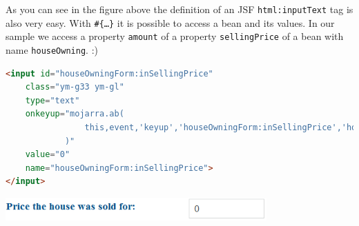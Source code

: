 As you can see in the figure above the definition of an JSF
\texttt{html:inputText} tag is also very easy. With \texttt{\#\{\ldots\}} it is
possible to access a bean and its values. In our sample we access a property
\texttt{amount} of a property \texttt{sellingPrice} of a bean with name
\texttt{houseOwning}. :)

\begin{lstlisting}[language=HTML]
<input id="houseOwningForm:inSellingPrice" 
	class="ym-g33 ym-gl" 
	type="text"
	onkeyup="mojarra.ab(
				this,event,'keyup','houseOwningForm:inSellingPrice','houseOwningForm:grp_ValueReside'
			)"
	value="0" 
	name="houseOwningForm:inSellingPrice">
</input>
\end{lstlisting}

\begin{center}
 \includegraphics[width=10cm]{./images/chapter02/referenceimpl_forms_text.png}
\end{center}






